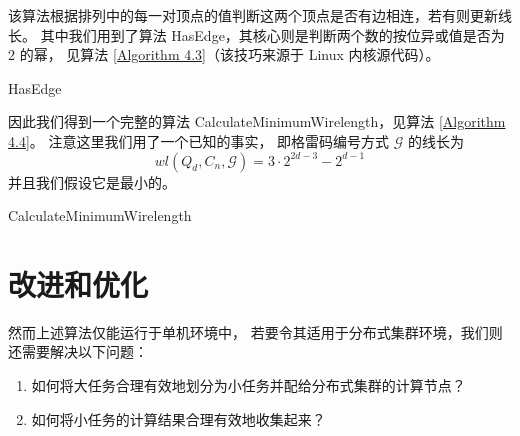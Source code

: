 该算法根据排列中的每一对顶点的值判断这两个顶点是否有边相连，若有则更新线长。
其中我们用到了算法 HasEdge，其核心则是判断两个数的按位异或值是否为 $2$ 的幂，
见算法 \ref{Algorithm 4.3}（该技巧来源于 Linux 内核源代码）。

\begin{algorithm}[h!]
\caption{HasEdge}
\label{Algorithm 4.3}
\begin{algorithmic}[1]
	 
	 

		\State{\Return{\True{}};}
	\Else
		\State{\Return{\False{}};}
	\EndIf
\end{algorithmic}
\end{algorithm}

因此我们得到一个完整的算法 CalculateMinimumWirelength，见算法 \ref{Algorithm 4.4}。
注意这里我们用了一个已知的事实，
即格雷码编号方式 $\mathcal{G}$ 的线长为
\begin{equation}
wl(Q_d, C_n, \mathcal{G}) = 3 \cdot 2^{2 d - 3} - 2^{d - 1}
\end{equation}
并且我们假设它是最小的。

\begin{algorithm}[h!]
\caption{CalculateMinimumWirelength}
\label{Algorithm 4.4}
\begin{algorithmic}[1]
	 
	 
	 

	 
\end{algorithmic}
\end{algorithm}

\section{改进和优化}
\label{Section 4.3}

然而上述算法仅能运行于单机环境中，
若要令其适用于分布式集群环境，我们则还需要解决以下问题：
\begin{enumerate}[(1)]
	\item\label{Question 1} 如何将大任务合理有效地划分为小任务并配给分布式集群的计算节点？
	\item\label{Question 2} 如何将小任务的计算结果合理有效地收集起来？
\end{enumerate}

